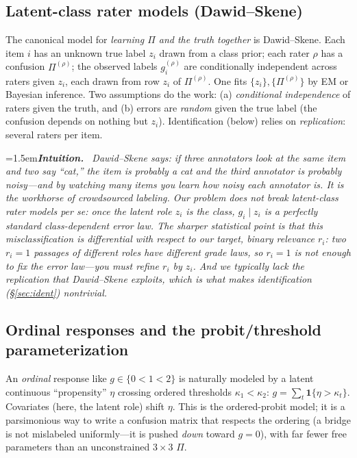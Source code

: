 \documentclass[11pt]{article}
\newenvironment{intuition}{\par\smallskip\noindent\hangindent=1.5em\textbf{\itshape Intuition.}\itshape\ \ignorespaces}{\par\smallskip}
\begin{document}
\subsection{Latent-class rater models (Dawid--Skene)}
The canonical model for \emph{learning $\Pi$ and the truth together} is Dawid--Skene. Each item $i$ has an
unknown true label $z_i$ drawn from a class prior; each rater $\rho$ has a confusion $\Pi^{(\rho)}$; the observed
labels $g_i^{(\rho)}$ are conditionally independent across raters given $z_i$, each drawn from row $z_i$ of
$\Pi^{(\rho)}$. One fits $\{z_i\},\{\Pi^{(\rho)}\}$ by EM or Bayesian inference. Two assumptions do the work:
(a) \emph{conditional independence} of raters given the truth, and (b) errors are \emph{random} given the true
label (the confusion depends on nothing but $z_i$). Identification (below) relies on \emph{replication}: several
raters per item.
\begin{intuition}
Dawid--Skene says: if three annotators look at the same item and two say ``cat,'' the item is probably a cat and
the third annotator is probably noisy---and by watching many items you learn \emph{how} noisy each annotator is.
It is the workhorse of crowdsourced labeling. Our problem does \emph{not} break latent-class rater models per
se: once the latent \emph{role} $z_i$ is the class, $g_i\mid z_i$ is a perfectly standard class-dependent error
law. The sharper statistical point is that this misclassification is \emph{differential} with respect to our
target, binary relevance $r_i$: two $r_i{=}1$ passages of different roles have different grade laws, so $r_i{=}1$
is not enough to fix the error law---you must refine $r_i$ by $z_i$. And we typically lack the replication that
Dawid--Skene exploits, which is what makes identification (\S\ref{sec:ident}) nontrivial.
\end{intuition}

\subsection{Ordinal responses and the probit/threshold parameterization}
An \emph{ordinal} response like $g\in\{0<1<2\}$ is naturally modeled by a latent continuous ``propensity''
$\eta$ crossing ordered thresholds $\kappa_1<\kappa_2$: $g=\sum_t\mathbf 1\{\eta>\kappa_t\}$. Covariates (here,
the latent role) shift $\eta$. This is the ordered-probit model; it is a parsimonious way to write a confusion
matrix that respects the ordering (a bridge is not mislabeled uniformly---it is pushed \emph{down} toward
$g{=}0$), with far fewer free parameters than an unconstrained $3\times3$ $\Pi$.
\end{document}
